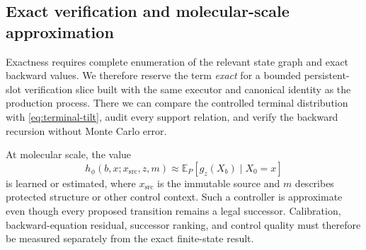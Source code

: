 \documentclass[10pt,letterpaper]{article}
\newcommand{\E}{\mathbb{E}}
\begin{document}
\subsection{Exact verification and molecular-scale approximation}

Exactness requires complete enumeration of the relevant state graph and exact
backward values. We therefore reserve the term \emph{exact} for a bounded
persistent-slot verification slice built with the same executor and canonical
identity as the production process. There we can compare the controlled
terminal distribution with \eqref{eq:terminal-tilt}, audit every support
relation, and verify the backward recursion without Monte Carlo error.

At molecular scale, the value
\[
  h_\phi(b,x;x_{\mathrm{src}},z,m)
  \approx
  \E_P[g_z(X_b)\mid X_0=x]
\]
is learned or estimated, where $x_{\mathrm{src}}$ is the immutable source and
$m$ describes protected structure or other control context. Such a controller
is approximate even though every proposed transition remains a legal
successor. Calibration, backward-equation residual, successor ranking, and
control quality must therefore be measured separately from the exact
finite-state result.









\clearpage
\appendix


\end{document}
